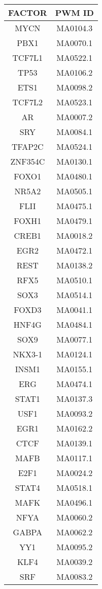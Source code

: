 \label{tab:dataencode.pfm.flrexp}
\twocolumn
\begin{supertabular}{cc}
        \hline
FACTOR & PWM ID\\
        \hline
MYCN & MA0104.3\\
PBX1 & MA0070.1\\
TCF7L1 & MA0522.1\\
TP53 & MA0106.2\\
ETS1 & MA0098.2\\
TCF7L2 & MA0523.1\\
AR & MA0007.2\\
SRY & MA0084.1\\
TFAP2C & MA0524.1\\
ZNF354C & MA0130.1\\
FOXO1 & MA0480.1\\
NR5A2 & MA0505.1\\
FLII & MA0475.1\\
FOXH1 & MA0479.1\\
CREB1 & MA0018.2\\
EGR2 & MA0472.1\\
REST & MA0138.2\\
RFX5 & MA0510.1\\
SOX3 & MA0514.1\\
FOXD3 & MA0041.1\\
HNF4G & MA0484.1\\
SOX9 & MA0077.1\\
NKX3-1 & MA0124.1\\
INSM1 & MA0155.1\\
ERG & MA0474.1\\
STAT1 & MA0137.3\\
USF1 & MA0093.2\\
EGR1 & MA0162.2\\
CTCF & MA0139.1\\
MAFB & MA0117.1\\
E2F1 & MA0024.2\\
STAT4 & MA0518.1\\
MAFK & MA0496.1\\
NFYA & MA0060.2\\
GABPA & MA0062.2\\
YY1 & MA0095.2\\
KLF4 & MA0039.2\\
SRF & MA0083.2\\

\end{supertabular}
